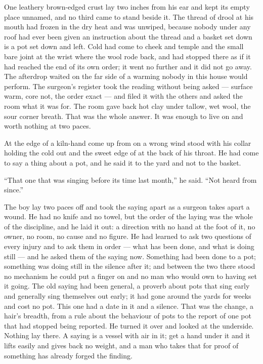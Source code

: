 One leathery brown-edged crust lay two inches from his ear and kept its empty place unnamed, and no third came to stand beside it. The thread of drool at his mouth had frozen in the dry heat and was unwiped, because nobody under any roof had ever been given an instruction about the thread and a basket set down is a pot set down and left. Cold had come to cheek and temple and the small bare joint at the wrist where the wool rode back, and had stopped there as if it had reached the end of its own order; it went no further and it did not go away. The afterdrop waited on the far side of a warming nobody in this house would perform. The surgeon's register took the reading without being asked --- surface warm, core not, the order exact --- and filed it with the others and asked the room what it was for. The room gave back hot clay under tallow, wet wool, the sour corner breath. That was the whole answer. It was enough to live on and worth nothing at two paces.

\scenebreak

At the edge of  a kiln-hand come up from  on a wrong wind stood with his collar holding the cold out and the sweet edge of  at the back of his throat. He had come to say a thing about a pot, and he said it to the yard and not to the basket.

“That one that was singing before its time last month,” he said. “Not heard from since.”

The boy lay two paces off and took the saying apart as a surgeon takes apart a wound. He had no knife and no towel, but the order of the laying was the whole of the discipline, and he laid it out: a direction with no hand at the foot of it, no owner, no room, no cause and no figure. He had learned to ask two questions of every injury and to ask them in order --- what has been done, and what is doing still --- and he asked them of the saying now. Something had been done to a pot; something was doing still in the silence after it; and between the two there stood no mechanism he could put a finger on and no man who would own to having set it going. The old saying had been general, a proverb about pots that sing early and generally sing themselves out early; it had gone around the yards for weeks and cost no pot. This one had a date in it and a silence. That was the change, a hair's breadth, from a rule about the behaviour of pots to the report of one pot that had stopped being reported. He turned it over and looked at the underside. Nothing lay there. A saying is a vessel with air in it; get a hand under it and it lifts easily and gives back no weight, and a man who takes that for proof of something has already forged the finding.

